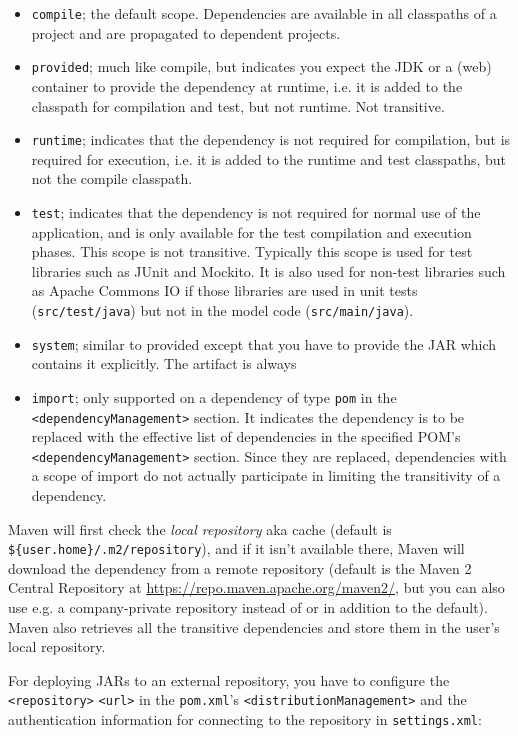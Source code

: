 \documentclass[8pt, table, xcdraw]{article}%
\begin{document}
\begin{itemize}
    \item \lstinline{compile}; the default scope. Dependencies are available in all classpaths of a project and are propagated to dependent projects.
    \item \lstinline{provided}; much like compile, but indicates you expect the JDK or a (web) container to provide the dependency at runtime, i.e. it is added to the classpath for compilation and test, but not runtime. Not transitive.
    \item \lstinline{runtime}; indicates that the dependency is not required for compilation, but is required for execution, i.e. it is added to the runtime and test classpaths, but not the compile classpath.
    \item \lstinline{test}; indicates that the dependency is not required for normal use of the application, and is only available for the test compilation and execution phases. This scope is not transitive. Typically this scope is used for test libraries such as JUnit and Mockito. It is also used for non-test libraries such as Apache Commons IO if those libraries are used in unit tests (\lstinline{src/test/java}) but not in the model code (\lstinline{src/main/java}).
    \item \lstinline{system}; similar to provided except that you have to provide the JAR which contains it explicitly. The artifact is always
    \item \lstinline{import}; only supported on a dependency of type \lstinline{pom} in the \lstinline{<dependencyManagement>} section. It indicates the dependency is to be replaced with the effective list of dependencies in the specified POM's \lstinline{<dependencyManagement>} section. Since they are replaced, dependencies with a scope of import do not actually participate in limiting the transitivity of a dependency.
\end{itemize}

Maven will first check the \emph{local repository} aka cache (default is \lstinline|${user.home}/.m2/repository|), and if it isn't available there, Maven will download the dependency from a remote repository (default is the Maven 2 Central Repository at \url{ https://repo.maven.apache.org/maven2/}, but you can also use e.g. a company-private repository instead of or in addition to the default). Maven also retrieves all the transitive dependencies and store them in the user's local repository.

For deploying JARs to an external repository, you have to configure the \lstinline{<repository>} \lstinline{<url>} in the \lstinline{pom.xml}'s \lstinline{<distributionManagement>} and the authentication information for connecting to the repository in \lstinline{settings.xml}:
\end{document}
